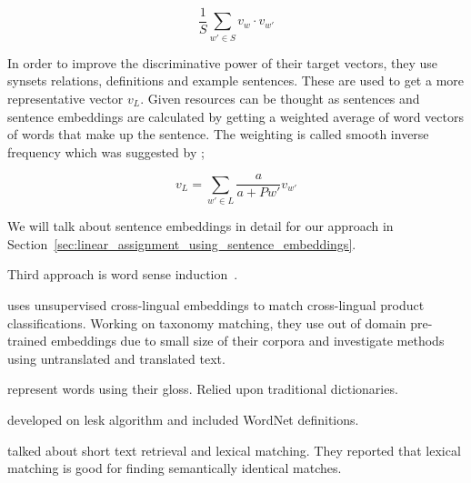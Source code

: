 \begin{displaymath}
    \frac{1}{S}\sum_{w' \in S}v_{w} \cdot v_{w'}
\end{displaymath}

In order to improve the discriminative power of their target vectors, they use synsets relations, definitions and example sentences.
These are used to get a more representative vector $v_{L}$.
Given resources can be thought as sentences and sentence embeddings are calculated by getting a weighted average of word vectors of words that make up the sentence.
The weighting is called smooth inverse frequency which was suggested by \textcite{arora_simple_2016};

\begin{displaymath}
    v_{L} = \sum_{w' \in L}\frac{a}{a + P{w'}}v_{w'}
\end{displaymath}

We will talk about sentence embeddings in detail for our approach in Section~\ref{sec:linear_assignment_using_sentence_embeddings}.

Third approach is word sense induction~\cite{arora_linear_2018}.


\textcite{gordeev_unsupervised_2018} uses unsupervised cross-lingual embeddings to match cross-lingual product classifications.
Working on taxonomy matching, they use out of domain pre-trained embeddings due to small size of their corpora and investigate methods using untranslated and translated text.

\textcite{lesk_automatic_1986} represent words using their gloss.
Relied upon traditional dictionaries.

\textcite{banerjee_adapted_2002} developed on lesk algorithm and included WordNet definitions.

\textcite{metzler_similarity_2007} talked about short text retrieval and lexical matching.
They reported that lexical matching is good for finding semantically identical matches.
